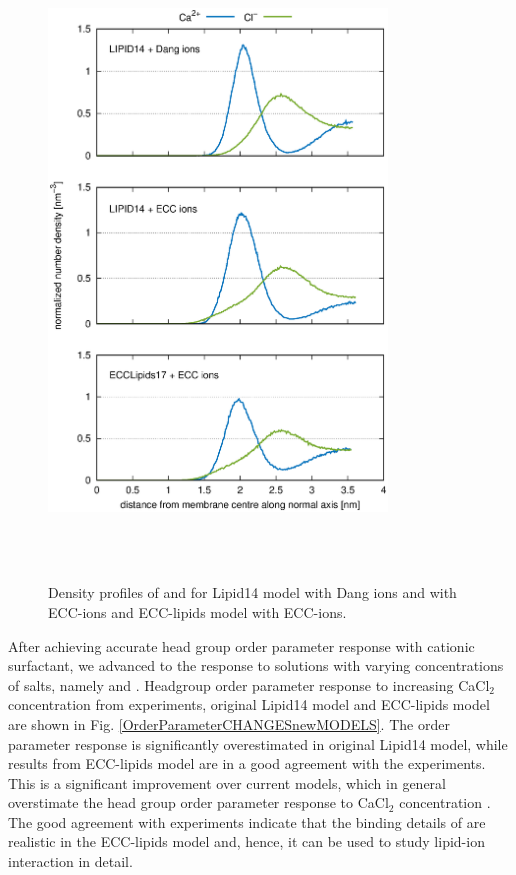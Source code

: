 \documentclass[aip,jcp,twocolumn]{revtex4}
\begin{document}
\begin{figure}[tbp]
  \centering
  \includegraphics[width=9.0cm,angle=0]{../Fig/CAdensities.eps}
  \caption{\label{fig:cacl-dens}
    Density profiles of  and  for Lipid14 model with Dang ions
    and with ECC-ions and ECC-lipids model with ECC-ions. }
   \\
   \\
\end{figure}

After achieving accurate head group order parameter response with cationic surfactant, 
we advanced to the response to solutions with varying concentrations of salts, namely  and . 
Headgroup order parameter response to increasing CaCl$_2$ concentration
from experiments, original Lipid14 model and ECC-lipids model are shown
in Fig. \ref{OrderParameterCHANGESnewMODELS}. The order parameter response
is significantly overestimated in original Lipid14 model, while results from
ECC-lipids model are in a good agreement with the experiments.
This is a significant improvement over current models,
which in general overstimate the head group order parameter response to CaCl$_2$
concentration \cite{catte16}. The good agreement with experiments indicate
that the binding details of  are realistic in the ECC-lipids model
and, hence, it can be used to study lipid-ion interaction in detail.
\end{document}
